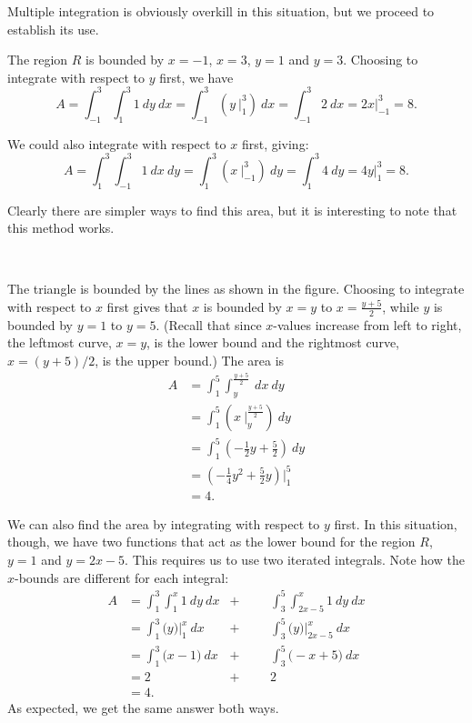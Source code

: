 {Multiple integration is obviously overkill in this situation, but we proceed to establish its use.

The region $R$ is bounded by $x=-1$, $x=3$, $y=1$ and $y=3$. Choosing to integrate with respect to $y$ first, we have 
$$A = \int_{-1}^3\int_1^3 1\ dy\ dx = \int_{-1}^3 \left(y\ \Big|_1^3\right)\ dx = \int_{-1}^3 2\ dx = 2x\Big|_{-1}^3=8.$$

We could also integrate with respect to $x$ first, giving:
$$A = \int_1^3\int_{-1}^3 1\ dx \ dy =\int_1^3 \left(x\ \Big|_{-1}^3\right)\ dy = \int_1^3 4\ dy = 4y\Big|_1^3 = 8.$$

Clearly there are simpler ways to find this area, but it is interesting to note that this method works.
}\\

{The triangle is bounded by the lines as shown in the figure. Choosing to integrate with respect to $x$ first gives that $x$ is bounded by $x=y$ to $x = \frac{y+5}2$, while $y$ is bounded by $y=1$ to $y=5$. (Recall that since $x$-values increase from left to right, the leftmost curve, $x=y$, is the lower bound and the rightmost curve, $x=(y+5)/2$, is the upper bound.) The area is
\begin{align*}
A &= \int_1^5\int_{y}^{\frac{y+5}2}\ dx\ dy \\
 &= \int_1^5\left(x\ \Big|_y^{\frac{y+5}2}\right)\ dy \\
&= \int_1^5 \left(-\frac12y+\frac52\right)\ dy \\
&= \left(-\frac14y^2+\frac52y\right)\Big|_1^5\\
&=4.
\end{align*}

We can also find the area by integrating with respect to $y$ first. In this situation, though, we have two functions that act as the lower bound for the region $R$, $y=1$ and $y=2x-5$. This requires us to use two iterated integrals. Note how the $x$-bounds are different for each integral:
\begin{align*}
A &= \int_1^3\int_1^x 1\ dy \ dx &+& & &\int_3^5\int_{2x-5}^x1\ dy\ dx\\
	&= \int_1^3\big(y\big)\Big|_1^x\ dx & + & & & \int_3^5\big(y\big)\Big|_{2x-5}^x\ dx\\
	&= \int_1^3\big(x-1\big)\ dx & + & & & \int_3^5\big(-x+5\big)\ dx \\
	&= 2 & + & & & 2 \\
	&=4.
\end{align*}
As expected, we get the same answer both ways.
}\\

